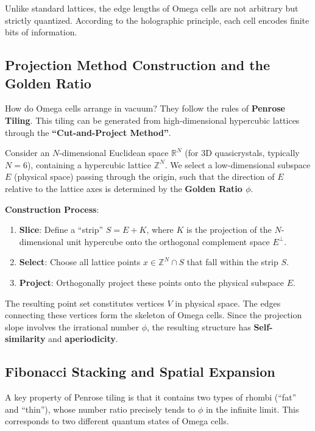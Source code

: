 Unlike standard lattices, the edge lengths of Omega cells are not arbitrary but strictly quantized. According to the holographic principle, each cell encodes finite bits of information.

\subsection{Projection Method Construction and the Golden Ratio}

How do Omega cells arrange in vacuum? They follow the rules of \textbf{Penrose Tiling}. This tiling can be generated from high-dimensional hypercubic lattices through the \textbf{``Cut-and-Project Method''}.

Consider an $N$-dimensional Euclidean space $\mathbb{R}^N$ (for 3D quasicrystals, typically $N=6$), containing a hypercubic lattice $\mathbb{Z}^N$. We select a low-dimensional subspace $E$ (physical space) passing through the origin, such that the direction of $E$ relative to the lattice axes is determined by the \textbf{Golden Ratio $\phi$}.

\textbf{Construction Process}:

\begin{enumerate}
\item \textbf{Slice}: Define a ``strip'' $S = E + K$, where $K$ is the projection of the $N$-dimensional unit hypercube onto the orthogonal complement space $E^\perp$.
\item \textbf{Select}: Choose all lattice points $x \in \mathbb{Z}^N \cap S$ that fall within the strip $S$.
\item \textbf{Project}: Orthogonally project these points onto the physical subspace $E$.
\end{enumerate}

The resulting point set constitutes vertices $V$ in physical space. The edges connecting these vertices form the skeleton of Omega cells. Since the projection slope involves the irrational number $\phi$, the resulting structure has \textbf{Self-similarity} and \textbf{aperiodicity}.

\subsection{Fibonacci Stacking and Spatial Expansion}

A key property of Penrose tiling is that it contains two types of rhombi (``fat'' and ``thin''), whose number ratio precisely tends to $\phi$ in the infinite limit. This corresponds to two different quantum states of Omega cells.


